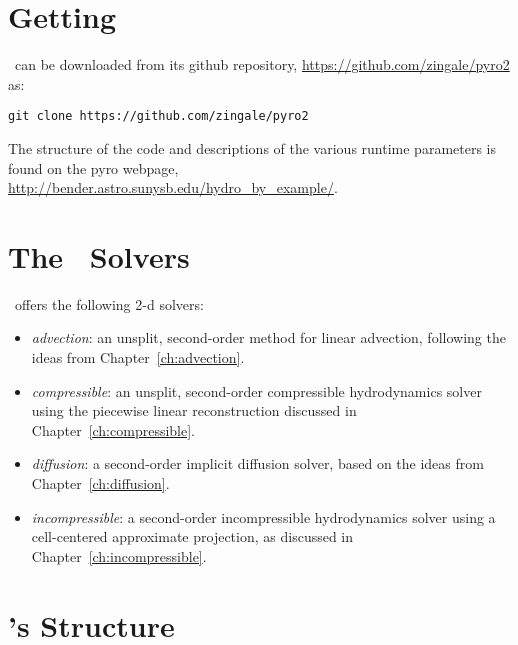 

\begin{quote}
\end{quote}


\section{Getting \pyro}

\pyro\ can be downloaded from its github repository, \url{https://github.com/zingale/pyro2} as:
\begin{verbatim}
git clone https://github.com/zingale/pyro2
\end{verbatim}

The structure of the code and descriptions of the various runtime
parameters is found on the pyro webpage,
\url{http://bender.astro.sunysb.edu/hydro_by_example/}.

\section{The \pyro\ Solvers}

\pyro\ offers the following 2-d solvers:
\begin{itemize}
\item {\em advection}: an unsplit, second-order method for linear advection,
  following the ideas from Chapter~\ref{ch:advection}.

\item {\em compressible}: an unsplit, second-order compressible hydrodynamics
  solver using the piecewise linear reconstruction discussed in Chapter~\ref{ch:compressible}.

\item {\em diffusion}: a second-order implicit diffusion solver, based
  on the ideas from Chapter~\ref{ch:diffusion}.

\item {\em incompressible}: a second-order incompressible hydrodynamics
  solver using a cell-centered approximate projection, as discussed
  in Chapter~\ref{ch:incompressible}.

\end{itemize}

\section{\pyro 's Structure}





